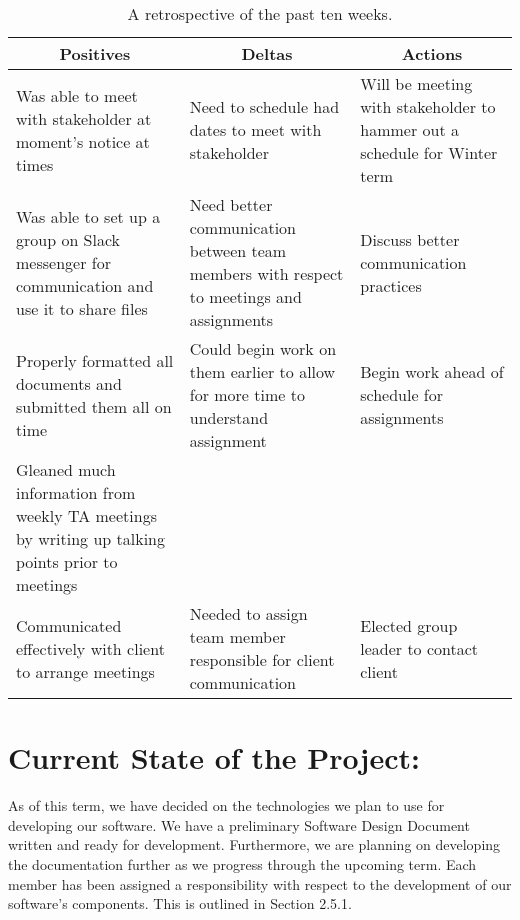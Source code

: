 \documentclass[journal,10pt,onecolumn,compsoc]{IEEEtran} \usepackage[margin=1.0in]{geometry} \usepackage{pdfpages}
\begin{document}
\begin{table}[H]
\begin{center}
 \begin{tabular}{ |p{}|p{}|p{}|} 
 \hline
 \multicolumn{1}{|c|}{\textbf{Positives}} 
 & 
\multicolumn{1}{|c|}{\textbf{Deltas}}  & 
\multicolumn{1}{|c|}{\textbf{Actions}}\\
 \hline
 
Was able to meet with stakeholder at moment's notice at times & Need to schedule had dates to meet with stakeholder & Will be meeting with stakeholder to hammer out a schedule for Winter term \\
 \hline
 
Was able to set up a group on Slack messenger for communication and use it to share files & Need better communication between team members with respect to meetings and assignments & Discuss better communication practices \\
 \hline
 
Properly formatted all documents and submitted them all on time & Could begin work on them earlier to allow for more time to understand assignment & Begin work ahead of schedule for assignments \\
 \hline
 
Gleaned much information from weekly TA meetings by writing up talking points prior to meetings & & \\
 \hline
 
Communicated effectively with client to arrange meetings & Needed to assign team member responsible for client communication & Elected group leader to contact client \\
 \hline
\end{tabular}
\caption{A retrospective of the past ten weeks.}
\label{table:1}
\end{center}
\end{table}
\newpage
\section{Current State of the Project:}
As of this term, we have decided on the technologies we plan to use for developing our software.
We have a preliminary Software Design Document written and ready for development.
Furthermore, we are planning on developing the documentation further as we progress through the upcoming term.
Each member has been assigned a responsibility with respect to the development of our software's components.
This is outlined in Section 2.5.1.
\end{document}
